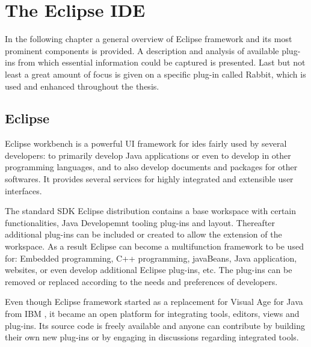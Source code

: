 \chapter{The Eclipse IDE}\label{cha:TheEclipseIDE}

In the following chapter a general overview of Eclipse framework and its most prominent components is provided. A description and analysis of available plug-ins from which essential information could be captured is presented. Last but not least a great amount of focus is given on a specific plug-in called Rabbit, which is used and enhanced throughout the thesis.  


\section{Eclipse}
\label{sec:TheEclipseIDE:eclipse}
Eclipse workbench is a powerful UI framework for \gls{ide}s fairly used by several developers: to primarily develop Java applications or even to develop in other programming languages, and to also develop documents and packages for other softwares. It provides several services for highly integrated and extensible user interfaces. 

The standard SDK Eclipse distribution contains a base workspace with certain functionalities, Java Developemnt tooling plug-ins and layout. Thereafter additional plug-ins can be included or created to allow the extension of the workspace. As a result Eclipse can become a multifunction framework to be used for: Embedded programming, C++ programming, javaBeans, Java application, websites, or even develop additional Eclipse plug-ins, etc. The plug-ins can be removed or replaced according to the needs and preferences of developers.

Even though Eclipse framework started as a replacement for Visual Age for Java from IBM , it became an open platform for integrating tools, editors, views and plug-ins. Its source code is freely available and anyone can contribute by building their own new plug-ins or by engaging in discussions regarding integrated tools.


